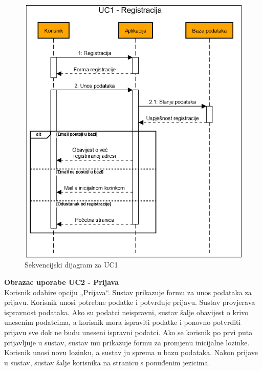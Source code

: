 				\begin{figure}[H]
					\includegraphics[width=\textwidth]{slike/UC1.PNG}
					\caption{Sekvencijski dijagram za UC1}
					\label{fig:sekv1}
				\end{figure} \newpage
				
				
				\noindent\textbf{Obrazac uporabe UC2 - Prijava}\\
				Korisnik odabire opciju „Prijava“. Sustav prikazuje formu za unos podataka za prijavu. Korisnik unosi potrebne podatke i potvrđuje prijavu. Sustav provjerava ispravnost podataka. Ako su podatci neispravni, sustav šalje obavijest o krivo unesenim podatcima, a korisnik mora ispraviti podatke i ponovno potvrditi prijavu sve dok ne budu uneseni ispravni podatci. Ako se korisnik po prvi puta prijavljuje u sustav, sustav mu prikazuje formu za promjenu inicijalne lozinke. Korisnik unosi novu lozinku, a sustav ju sprema u bazu podataka. Nakon prijave u sustav, sustav šalje korisnika na stranicu s ponuđenim jezicima.
				
